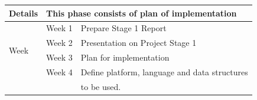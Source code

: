 \documentclass[oneside,a4paper,12pt]{report}
\begin{document}
\begin{table}[h!]
\begin{center}
\begin{tabular}{|l|l|l|}
Details               & \multicolumn{2}{|l|}{This phase consists of plan of implementation}                                                                                           \\ \hline
\multirow{4}{*}{Week} & Week 1                             & Prepare Stage 1 Report                                                                                                   \\ \cline{2-3} 
                      & Week 2                             & Presentation on Project Stage 1                                                                                          \\ \cline{2-3} 
                      & Week 3                             & Plan for implementation                                                                                                  \\ \cline{2-3} 
                      & Week 4                             & Define platform, language and data structures  
\\ \cline{2-3}
                      & 								   & to be used.  


\end{tabular}
\end{center}
\end{table}
\end{document}
